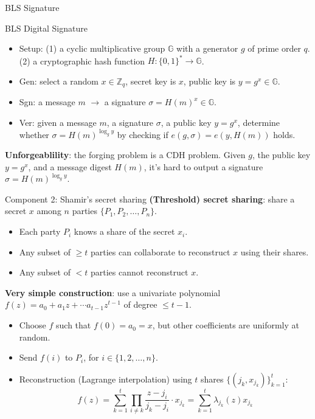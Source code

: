 \begin{frame}  {BLS Signature~\cite{DBLP:journals/joc/BonehLS04} }

\begin{block}{BLS Digital Signature}
    \begin{itemize}
        \item Setup: (1) a cyclic multiplicative group $\mathbb{G}$ with a generator $g$ of prime order $q$. (2) a cryptographic hash function $H:\{0,1\}^\ast \to \mathbb{G}$. 
        \item Gen: select a random $x\in \mathbb{Z}_{q}$, secret key is $x$, public key is $y=g^x \in \mathbb{G}$. 
        \item Sgn: a message $m$ $\to$ a signature $\sigma = H(m)^x \in \mathbb{G}$. 
        \item Ver: given a message $m$, a signature $\sigma$, a public key $y=g^x$, determine whether $\sigma = H(m)^{\log_g y}$ by checking if $e(g, \sigma) = e(y, H(m))$ holds.   
    \end{itemize}
\end{block} \pause
\textbf{Unforgeablility}: the forging problem is a CDH problem. Given $g$, the public key $y=g^x$, and a message digest $H(m)$, it's hard to output a signature $\sigma=H(m)^{\log_g y}$.

\end{frame}

\begin{frame}{Component 2: Shamir's secret sharing}
\textbf{(Threshold) secret sharing}: share a secret $x$ among $n$ parties $\{P_1,P_2,\dots, P_n\}$. 
\begin{itemize}
\item Each party $P_i$ knows a share of the secret $x_i$.
\item Any subset of $\ge t$ parties can collaborate to reconstruct $x$ using their shares. 
\item Any subset of $<t$ parties cannot reconstruct $x$. 
\end{itemize}
\pause 

\vspace{0.5em}
\textbf{Very simple construction}: use a univariate polynomial $f(z)=a_0 + a_1 z+\cdots a_{t-1}z^{t-1}$ of degree $\le t-1$. 
\begin{itemize}
    \item Choose $f$ such that $f(0)=a_0=x$, but other coefficients are uniformly at random. 
    \item Send $f(i)$ to $P_i$, for $i\in\{1,2,\dots,n\}$. 
    \item Reconstruction (Lagrange interpolation) using $t$ shares $\{(j_k, x_{j_k})\}_{k=1}^t$: \begin{equation*} 
        f(z) = \sum_{k=1}^{t}\prod_{i \neq k }\frac{z - j_i}{j_k - j_i}\cdot x_{j_k} = \sum_{k=1}^t \lambda_{j_k}(z) x_{j_k}
    \end{equation*}  
\end{itemize}
\end{frame}



